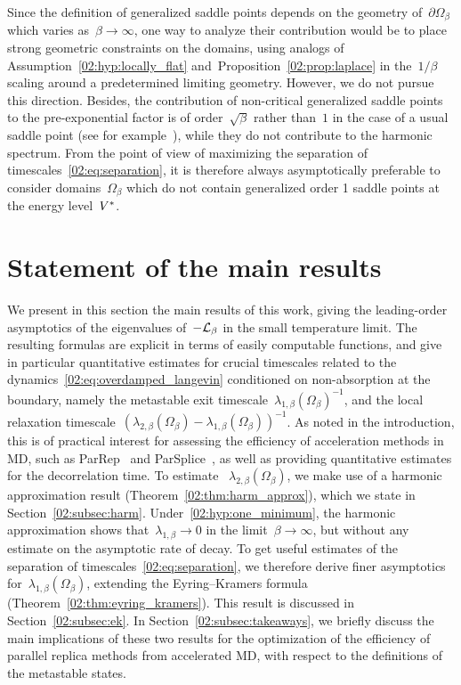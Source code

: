    Since the definition of generalized saddle points depends on the geometry of~$\partial\Omega_\beta$ which varies as~$\beta\to\infty$, one way to analyze their contribution would be to place strong geometric constraints on the domains, using analogs of Assumption~\eqref{02:hyp:locally_flat} and~Proposition~\ref{02:prop:laplace} in the~$1/\beta$ scaling around a predetermined limiting geometry. 
    However, we do not pursue this direction. Besides, the contribution of non-critical generalized saddle points to the pre-exponential factor is of order~$\sqrt\beta$ rather than~$1$ in the case of a usual saddle point (see for example~\cite{HN06}), while they do not contribute to the harmonic spectrum. From the point of view of maximizing the separation of timescales~\eqref{02:eq:separation}, it is therefore always asymptotically preferable to consider domains~$\Omega_\beta$ which do not contain generalized order 1 saddle points at the energy level~$V^*$.
 
    \section{Statement of the main results}
    \label{02:sec:main_results}
    We present in this section the main results of this work, giving the leading-order asymptotics of the eigenvalues of~$-\mathcal{L}_\beta$ in the small temperature limit.
    The resulting formulas are explicit in terms of easily computable functions, and give in particular quantitative estimates for crucial timescales related to the dynamics~\eqref{02:eq:overdamped_langevin} conditioned on non-absorption at the boundary,
    namely the metastable exit timescale~$\lambda_{1,\beta}(\Omega_\beta)^{-1}$, and the local relaxation timescale~$\left(\lambda_{2,\beta}(\Omega_\beta)-\lambda_{1,\beta}(\Omega_\beta)\right)^{-1}$.
    As noted in the introduction, this is of practical interest for assessing the efficiency of acceleration methods in MD, such as ParRep~\cite{V98,PUV15,LBLLP12} and ParSplice~\cite{PCWKV16}, as well as providing quantitative estimates for the decorrelation time.
    To estimate ~$\lambda_{2,\beta}(\Omega_\beta)$, we make use of a harmonic approximation result (Theorem~\ref{02:thm:harm_approx}), which we state in Section~\ref{02:subsec:harm}.
    Under~\eqref{02:hyp:one_minimum}, the harmonic approximation shows that~$\lambda_{1,\beta}\to 0$ in the limit~$\beta\to\infty$, but without any estimate on the asymptotic rate of decay. To get useful estimates of the separation of timescales~\eqref{02:eq:separation}, we therefore derive finer asymptotics for~$\lambda_{1,\beta}(\Omega_\beta)$, extending the Eyring--Kramers formula (Theorem~\ref{02:thm:eyring_kramers}). This result is discussed in Section~\ref{02:subsec:ek}.
    In Section~\ref{02:subsec:takeaways}, we briefly discuss the main implications of these two results for the optimization of the efficiency of parallel replica methods from accelerated MD, with respect to the definitions of the metastable states.

